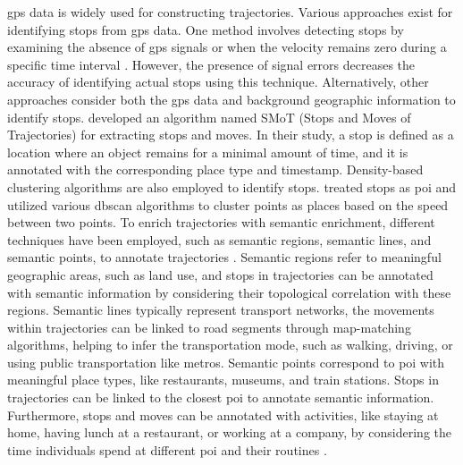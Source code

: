 \documentclass{article}
\theoremstyle{definition}
\theoremstyle{remark}
\begin{document}
\acrfull{gps} data is widely used for constructing trajectories. Various approaches exist for identifying stops from \acrshort{gps} data. One method involves detecting stops by examining the absence of \acrshort{gps} signals or when the velocity remains zero during a specific time interval \citep{ashbrook_using_2003}. However, the presence of signal errors decreases the accuracy of identifying actual stops using this technique. Alternatively, other approaches consider both the \acrshort{gps} data and background geographic information to identify stops. \cite{alvares_model_2007} developed an algorithm named SMoT (Stops and Moves of Trajectories) for extracting stops and moves. In their study, a stop is defined as a location where an object remains for a minimal amount of time, and it is annotated with the corresponding place type and timestamp. Density-based clustering algorithms are also employed to identify stops. \cite{palma_clustering-based_2008} treated stops as \acrshort{poi} and utilized various \acrshort{dbscan} algorithms to cluster points as places based on the speed between two points. To enrich trajectories with semantic enrichment, different techniques have been employed, such as semantic regions, semantic lines, and semantic points, to annotate trajectories \citep{yan_semantic_2013}. Semantic regions refer to meaningful geographic areas, such as land use, and stops in trajectories can be annotated with semantic information by considering their topological correlation with these regions. Semantic lines typically represent transport networks, the movements within trajectories can be linked to road segments through map-matching algorithms, helping to infer the transportation mode, such as walking, driving, or using public transportation like metros. Semantic points correspond to \acrshort{poi} with meaningful place types, like restaurants, museums, and train stations. Stops in trajectories can be linked to the closest \acrshort{poi} to annotate semantic information. Furthermore, stops and moves can be annotated with activities, like staying at home, having lunch at a restaurant, or working at a company, by considering the time individuals spend at different \acrshort{poi} and their routines \cite{parent_semantic_2013}.
\end{document}

